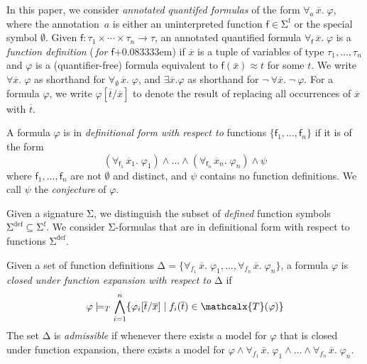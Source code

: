 \documentclass[runningheads,a4paper]{llncs}
\newcommand\DDD{\Delta}
\newcommand{\con}[1]{\mathsf{#1}}
\renewcommand\vec[1]{\overline{#1}}
\let\oldSigma=\Sigma
\def\Sigma{\mathrm{\oldSigma}}
\let\oldDelta=\Delta
\def\Delta{\mathrm{\oldDelta}}
\let\oldneg=\neg
\def\neg{\oldneg\:}
\let\oldwedge=\wedge
\def\wedge{\mathrel{\oldwedge}}
\newcommand{\teq}{\approx}
\newcommand{\terms}{\mathcalx{T}}
\newcommand{\sfuns}[1]{#1^\mathrm{f}}
\newcommand{\sfundefs}[1]{#1^\mathrm{def}}
\newcommand{\forallf}[1]{\forall_{\!#1\:}}
\newcommand{\fnull}{\emptyset}
\newcommand{\rem}[1]{\textcolor{red}{[#1]}}
\newcommand{\ct}[1]{\rem{#1 --ct}}
\newcommand{\vthinspace}{\kern+0.083333em}
\begin{document}
In this paper, we consider \emph{annotated quantifed formulas} of the form
$\forallf{a} \vec x.\; \varphi$, where the annotation~$a$ is either
an uninterpreted function $\con{f} \in \sfuns{\Sigma}$ or the special symbol
$\fnull$.
Given $\con{f} : \tau_1 \times \cdots \times \tau_n \rightarrow \tau$,
an annotated
quantified formula $\forallf{\con{f}} \vec x.\; \varphi$ is a \emph{function definition}
(\,\emph{for $\con{f}$}\vthinspace) if $\vec x$ is a tuple of variables of type
$\tau_1, \ldots, \tau_n$ and $\varphi$ is a (quantifier-free) formula equivalent to
$\con{f}( \vec x ) \teq t$ for some $t$. We write $\forall \vec
x.\; \varphi$ as shorthand for $\forallf{\fnull} \vec x.\; \varphi$, and $\exists
\vec x. \varphi$ as shorthand for $\neg \forall \vec x.\; \neg \varphi$.
For a formula $\varphi$,
we write $\varphi[\vec t/\vec x]$ to denote the result of replacing all occurrences of $\vec x$ with $\vec t$.

\begin{definition}%
\rm
A formula $\varphi$ is in \emph{definitional form with respect to} functions $\{
\con{f}_1, \ldots, \con{f}_n \}$ if it is of the form
%
%
\begin{equation} \label{eq:wdf}
(\forallf{\con{f}_1} \vec x_1.\; \varphi_1) \wedge \ldots \wedge (\forallf{\con{f}_n} \vec x_n.\; \varphi_n) \wedge \psi
\end{equation}
%
where $\con{f}_1, \ldots, \con{f}_n$ are not $\fnull$ and distinct,
and $\psi$ contains no function definitions.
We call $\psi$ the \emph{conjecture} of $\varphi$.
\end{definition}

Given a signature $\Sigma$,
we distinguish the subset of \emph{defined} function symbols $\sfundefs{\Sigma}
\subseteq \sfuns{\Sigma}$.
We consider $\Sigma$-formulas that are in definitional form with respect to
functions $\sfundefs{\Sigma}$.

\begin{definition}
Given a set of function definitions $\DDD = \{ \forallf{f_1} \vec x.\; \varphi_1, \ldots, \forallf{f_n} \vec x.\; \varphi_n \}$,
a formula $\varphi$ is \emph{closed under function expansion with respect to $\DDD$} if
\begin{eqnarray}
\varphi \models_T \bigwedge_{i=1}^n \{ \varphi_i[ \vec t / \vec x ] \mid f_i( \vec t ) \in \terms( \varphi ) \}
\end{eqnarray}
The set $\DDD$ is \emph{admissible} if whenever there exists a model for $\varphi$ that is closed under function expansion,
there exists a model for $\varphi \wedge \forallf{f_1} \vec x.\; \varphi_1 \wedge \ldots \wedge \forallf{f_n} \vec x.\; \varphi_n$.
\end{definition}
\end{document}
